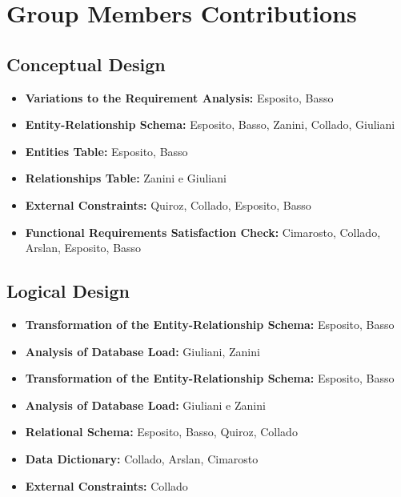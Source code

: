 \section{Group Members Contributions}


\subsection{Conceptual Design}
\begin{itemize}
	\item \textbf{Variations to the Requirement Analysis:} Esposito, Basso
	\item \textbf{Entity-Relationship Schema:} Esposito, Basso, Zanini, Collado, Giuliani 
	\item \textbf{Entities Table:} Esposito, Basso
	\item \textbf{Relationships Table:} Zanini e Giuliani
	\item \textbf{External Constraints:} Quiroz, Collado, Esposito, Basso
	\item \textbf{Functional Requirements Satisfaction Check:} Cimarosto, Collado, Arslan, Esposito, Basso
\end{itemize}

\subsection{Logical Design}
\begin{itemize}
	\item \textbf{Transformation of the Entity-Relationship Schema:} Esposito, Basso 
	\item \textbf{Analysis of Database Load:} Giuliani, Zanini
	\item \textbf{Transformation of the Entity-Relationship Schema:} Esposito, Basso
	\item \textbf{Analysis of Database Load:} Giuliani e Zanini
	\item \textbf{Relational Schema:} Esposito, Basso, Quiroz, Collado
	\item \textbf{Data Dictionary:} Collado, Arslan, Cimarosto
	\item \textbf{External Constraints:} Collado
\end{itemize}	